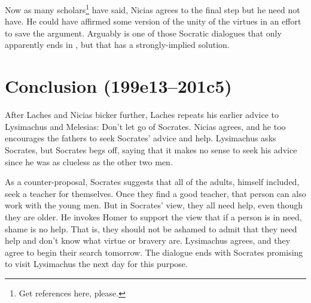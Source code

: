 \documentclass[11pt]{article}
\begin{document}
Now as many scholars\footnote{Get references here, please.} have said, Nicias
agrees to the final step but he need not have.  He could have affirmed some
version of the unity of the virtues in an effort to save the argument.
Arguably  is one of those Socratic dialogues that only apparently
ends in , but that has a strongly-implied solution.




\section{Conclusion (199e13--201c5)}

After Laches and Nicias bicker further, Laches repeats his earlier advice to
Lysimachus and Melesias: Don't let go of Socrates.  Nicias agrees, and he too
encourages the fathers to seek Socrates' advice and help.  Lysimachus asks
Socrates, but Socrates begs off, saying that it makes no sense to seek his
advice since he was as clueless as the other two men.

As a counter-proposal, Socrates suggests that all of the adults, himself
included, seek a teacher for themselves.  Once they find a good teacher, that
person can also work with the young men.  But in Socrates' view, they all need
help, even though they are older.  He invokes Homer to support the view that if
a person is in need, shame is no help.  That is, they should not be ashamed to
admit that they need help and don't know what virtue or bravery are.
Lysimachus agrees, and they agree to begin their search tomorrow.  The dialogue
ends with Socrates promising to visit Lysimachus the next day for this purpose.



\newpage


\end{document}
